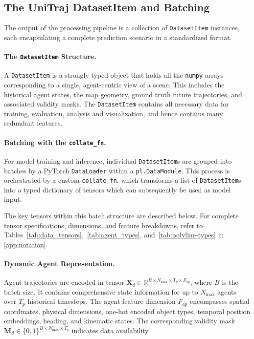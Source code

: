 \subsection{The UniTraj DatasetItem and Batching}
\label{ssec:unitraj_dataset}

The output of the processing pipeline is a collection of \texttt{DatasetItem} instances, each encapsulating a complete prediction scenario in a standardized format.

\paragraph{The \texttt{DatasetItem} Structure.}
A \texttt{DatasetItem} is a strongly typed object that holds all the \texttt{numpy} arrays corresponding to a single, agent-centric view of a scene. This includes the historical agent states, the map geometry, ground truth future trajectories, and associated validity masks. The \texttt{DatasetItem} contains all necessary data for training, evaluation, analysis and visualization, and hence contains many redundant features.

\paragraph{Batching with the \texttt{collate\_fn}.}
For model training and inference, individual \texttt{DatasetItem}s are grouped into batches by a PyTorch \texttt{DataLoader} within a \texttt{pl.DataModule}. This process is orchestrated by a custom \texttt{collate\_fn}, which transforms a list of \texttt{DatasetItem}s into a typed dictionary of tensors which can subsequently be used as model input.

The key tensors within this batch structure are described below. For complete tensor specifications, dimensions, and feature breakdowns, refer to Tables~\ref{tab:data_tensors},~\ref{tab:agent_types}, and~\ref{tab:polyline-types} in \autoref{app:notation}.

\paragraph{Dynamic Agent Representation.}
Agent trajectories are encoded in tensor \(\boldsymbol{X}_d \in \mathbb{R}^{B \times N_{\max} \times T_p \times F_{ap}}\), where \(B\) is the batch size. It contains comprehensive state information for up to \(N_{\max}\) agents over \(T_p\) historical timesteps. The agent feature dimension \(F_{ap}\) encompasses spatial coordinates, physical dimensions, one-hot encoded object types, temporal position embeddings, heading, and kinematic states. The corresponding validity mask \(\boldsymbol{M}_d \in \{0,1\}^{B \times N_{\max} \times T_p}\) indicates data availability.

